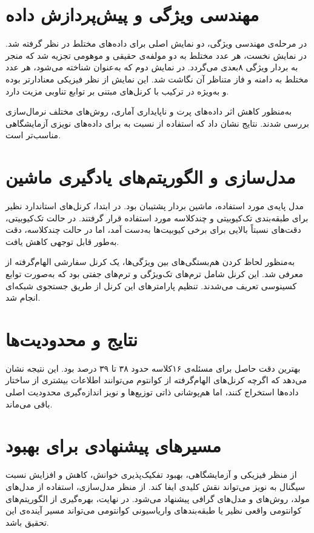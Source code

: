\documentclass[12pt,a4paper]{article}
\begin{document}
\section{مهندسی ویژگی و پیش‌پردازش داده}
در مرحله‌ی مهندسی ویژگی، دو نمایش اصلی برای داده‌های مختلط در نظر گرفته شد. در نمایش نخست، هر عدد مختلط به دو مولفه‌ی حقیقی و موهومی تجزیه شد که منجر به بردار ویژگی ۸بعدی می‌گردد. در نمایش دوم که به‌عنوان  شناخته می‌شود، هر عدد مختلط به دامنه و فاز متناظر آن نگاشت شد. این نمایش از نظر فیزیکی معنادارتر بوده و به‌ویژه در ترکیب با کرنل‌های مبتنی بر توابع تناوبی مزیت دارد.

به‌منظور کاهش اثر داده‌های پرت و ناپایداری آماری، روش‌های مختلف نرمال‌سازی بررسی شدند. نتایج نشان داد که استفاده از  نسبت به  برای داده‌های نویزی آزمایشگاهی مناسب‌تر است.

\section{مدل‌سازی و الگوریتم‌های یادگیری ماشین}
مدل پایه‌ی مورد استفاده، ماشین بردار پشتیبان  بود. در ابتدا، کرنل‌های استاندارد نظیر  برای طبقه‌بندی تک‌کیوبیتی و چندکلاسه مورد استفاده قرار گرفتند. در حالت تک‌کیوبیتی، دقت‌های نسبتاً بالایی برای برخی کیوبیت‌ها به‌دست آمد، اما در حالت چندکلاسه، دقت به‌طور قابل توجهی کاهش یافت.

به‌منظور لحاظ کردن هم‌بستگی‌های بین ویژگی‌ها، یک کرنل سفارشی الهام‌گرفته از  معرفی شد. این کرنل شامل ترم‌های تک‌ویژگی و ترم‌های جفتی بود که به‌صورت توابع کسینوسی تعریف می‌شدند. تنظیم پارامترهای این کرنل از طریق جستجوی شبکه‌ای انجام شد.

\section{نتایج و محدودیت‌ها}
بهترین دقت حاصل برای مسئله‌ی ۱۶کلاسه حدود ۳۸ تا ۳۹ درصد بود. این نتیجه نشان می‌دهد که اگرچه کرنل‌های الهام‌گرفته از کوانتوم می‌توانند اطلاعات بیشتری از ساختار داده‌ها استخراج کنند، اما هم‌پوشانی ذاتی توزیع‌ها و نویز اندازه‌گیری محدودیت اصلی باقی می‌ماند.

\section{مسیرهای پیشنهادی برای بهبود}
از منظر فیزیکی و آزمایشگاهی، بهبود تفکیک‌پذیری خوانش، کاهش  و افزایش نسبت سیگنال به نویز می‌تواند نقش کلیدی ایفا کند. از منظر مدل‌سازی، استفاده از مدل‌های مولد، روش‌های  و مدل‌های گرافی پیشنهاد می‌شود. در نهایت، بهره‌گیری از الگوریتم‌های کوانتومی واقعی نظیر  یا طبقه‌بندهای واریاسیونی کوانتومی می‌تواند مسیر آینده‌ی این تحقیق باشد.
\end{document}
